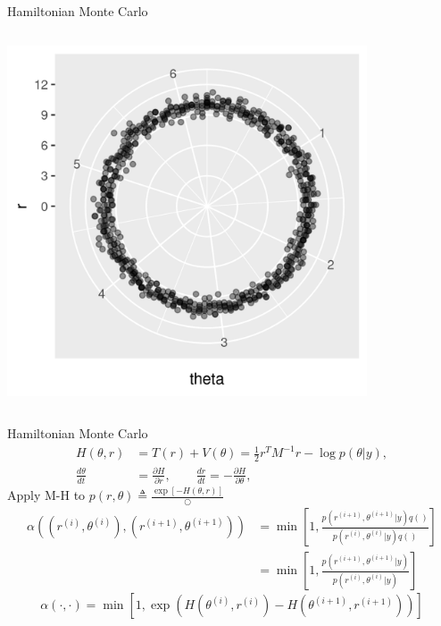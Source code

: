\documentclass[bigger]{beamer}
\begin{document}
\begin{frame}[label={sec:org9d561ff}]{Hamiltonian Monte Carlo}
\begin{columns}
\begin{column}{0.5\columnwidth}
\begin{center}
\includegraphics[width=0.8\textwidth]{./figure/d100_normal_point.png}
\end{center}
\end{column}
\end{columns}
\end{frame}


\begin{frame}[label={sec:org29ebbcb}]{Hamiltonian Monte Carlo}
\begin{align*}
  H(\theta, r) &= T(r) + V(\theta) = \frac{1}{2}r^TM^{-1}r - \log{p(\theta|y)},\\
  \frac{d\theta}{dt} &= \frac{\partial H}{\partial r},\qquad
  \frac{dr}{dt} = -\frac{\partial H}{\partial \theta},
\end{align*}
Apply M-H to \(p(r, \theta) \triangleq \frac{\exp{[-H(\theta, r)]}}{\bigcirc}\)
\begin{align*}
  \alpha((r^{(i)}, \theta^{(i)}), (r^{(i+1)}, \theta^{(i+1)})) &= \min\left[
    1, \frac{p(r^{(i+1)}, \theta^{(i+1)}|y)q()}{p(r^{(i)}, \theta^{(i)}|y)q()}
  \right]\\
  &= \min\left[
    1, \frac{p(r^{(i+1)}, \theta^{(i+1)}|y)}{p(r^{(i)}, \theta^{(i)}|y)}
  \right]
\end{align*}
\begin{equation*}
  \alpha(\cdot, \cdot) =\min\left[
    1, \exp{(H(\theta^{(i)}, r^{(i)}) - H(\theta^{(i+1)}, r^{(i+1)}))}
  \right]
\end{equation*}
\end{frame}
\end{document}
